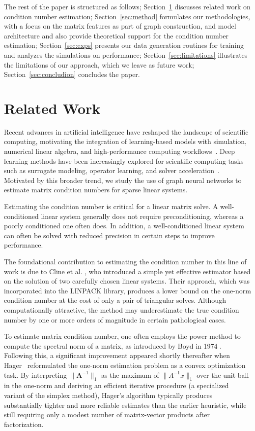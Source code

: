 \documentclass[11pt,a4paper]{article}
\theoremstyle{plain}
\theoremstyle{definition}
\theoremstyle{remark}
\begin{document}
The rest of the paper is structured as follows; Section~\ref{sec:related} discusses related work on condition number estimation; Section~\ref{sec:method} formulates our methodologies, with a focus on the matrix features as part of graph construction,  and model architecture and also provide theoretical support for the condition number estimation; Section~\ref{sec:exps} presents our data generation routines for training and analyzes the simulations on performance; Section~\ref{sec:limitations} illustrates the limitations of our approach, which we leave as future work; Section~\ref{sec:concludion} concludes the paper. 



\section{Related Work}\label{sec:related}
Recent advances in artificial intelligence have reshaped the landscape of scientific computing, motivating the integration of learning-based models with simulation, numerical linear algebra, and high-performance computing workflows~\cite{doi:10.1126/science.aef4214}. Deep learning methods have been increasingly explored for scientific computing tasks such as surrogate modeling, operator learning, and solver acceleration~\cite{karniadakis2021physics, li2020fourier}. Motivated by this broader trend, we study the use of graph neural networks to estimate matrix condition numbers for sparse linear systems. 

Estimating the condition number is critical for a linear matrix solve. A well-conditioned linear system generally does not require preconditioning, whereas a poorly conditioned one often does. In addition, a well-conditioned linear system can often be solved with reduced precision in certain steps to improve performance. 

The foundational contribution to estimating the condition number in this line of work is due to Cline et al. \cite{Cline1979}, who introduced a simple yet effective estimator based on the solution of two carefully chosen linear systems. Their approach, which was incorporated into the LINPACK library, produces a lower bound on the one-norm condition number at the cost of only a pair of triangular solves. Although computationally attractive, the method may underestimate the true condition number by one or more orders of magnitude in certain pathological cases. 


To estimate matrix condition number, one often employs the power method to compute the spectral norm of a matrix, as introduced by Boyd in 1974 \cite{BOYD197495}.  Following this, a significant improvement appeared shortly thereafter when Hager~\cite{hager1984condition} reformulated the one-norm estimation problem as a convex optimization task. By interpreting $\|\mathbf{A}^{-1}\|_1$ as the maximum of $\|A^{-1}x\|_1$ over the unit ball in the one-norm and deriving an efficient iterative procedure (a specialized variant of the simplex method), Hager's algorithm typically produces substantially tighter and more reliable estimates than the earlier heuristic, while still requiring only a modest number of matrix-vector products after factorization.
\end{document}
